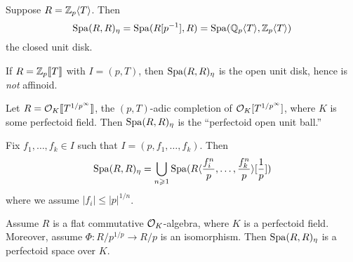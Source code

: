 \documentclass{article}
\begin{document}
\begin{example}
Suppose $R=\mathbb{Z}_p\langle T\rangle$. Then 
\[
  \operatorname{Spa}(R,R)_\eta = \operatorname{Spa}(R[p^{-1}],R) = \operatorname{Spa}(\mathbb{Q}_p\langle T\rangle, \mathbb{Z}_p\langle T\rangle) 
\]
the closed unit disk. 
\end{example}

\begin{example}
If $R=\mathbb{Z}_p\llbracket {T} \rrbracket$ with $I=(p,T)$, then $\operatorname{Spa}(R,R)_\eta$ is the open unit disk, 
hence is \emph{not} affinoid. 
\end{example}

\begin{example}
Let $R=\mathcal{O}_K\llbracket {T^{1/p^\infty}} \rrbracket$, the $(p,T)$-adic completion of 
$\mathcal{O}_K[T^{1/p^\infty}]$, where $K$ is some perfectoid field. Then 
$\operatorname{Spa}(R,R)_\eta$ is the ``perfectoid open unit ball.'' 
\end{example}

\begin{proposition}
Fix $f_1,\dots,f_k\in I$ such that $I=(p,f_1,\dots,f_k)$. Then 
\[
  \operatorname{Spa}(R,R)_\eta = \bigcup_{n\geqslant 1} \operatorname{Spa}(R\langle \frac{f_i^n}{p},\dots,\frac{f_k^n}{p}\rangle[\frac 1 p])
\]
where we assume $|f_i|\leqslant |p|^{1/n}$. 
\end{proposition}

\begin{proposition}
Assume $R$ is a flat commutative $\mathcal{O}_K$-algebra, where $K$ is a perfectoid field. 
Moreover, assume $\Phi:R/p^{1/p}\to R/p$ is an isomorphism. Then 
$\operatorname{Spa}(R,R)_\eta$ is a perfectoid space over $K$. 
\end{proposition}
\end{document}
